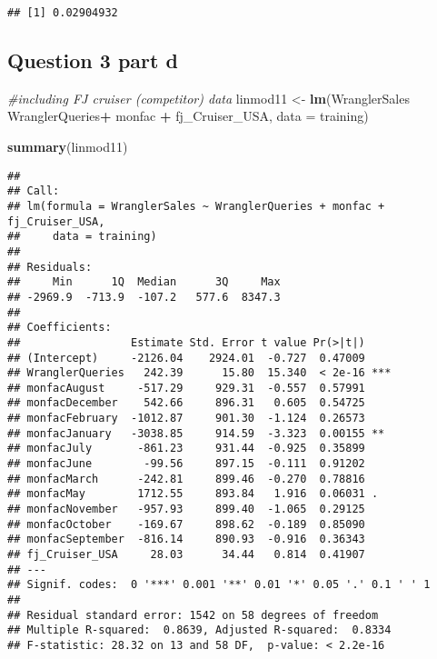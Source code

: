 \documentclass[]{article}
\newenvironment{Shaded}{\begin{snugshade}}{\end{snugshade}}
\newcommand{\KeywordTok}[1]{\textcolor[rgb]{0.13,0.29,0.53}{\textbf{#1}}}
\newcommand{\DataTypeTok}[1]{\textcolor[rgb]{0.13,0.29,0.53}{#1}}
\newcommand{\StringTok}[1]{\textcolor[rgb]{0.31,0.60,0.02}{#1}}
\newcommand{\CommentTok}[1]{\textcolor[rgb]{0.56,0.35,0.01}{\textit{#1}}}
\newcommand{\OperatorTok}[1]{\textcolor[rgb]{0.81,0.36,0.00}{\textbf{#1}}}
\newcommand{\NormalTok}[1]{#1}
\begin{document}
\begin{verbatim}
## [1] 0.02904932
\end{verbatim}

\subsection{Question 3 part d}\label{question-3-part-d}

\begin{Shaded}
\begin{Highlighting}[]
\CommentTok{#including FJ cruiser (competitor) data}
\NormalTok{linmod11 <-}\StringTok{ }\KeywordTok{lm}\NormalTok{(WranglerSales }\OperatorTok{~}\StringTok{ }\NormalTok{WranglerQueries}\OperatorTok{+}\StringTok{ }\NormalTok{monfac }\OperatorTok{+}\StringTok{ }\NormalTok{fj_Cruiser_USA, }\DataTypeTok{data =}\NormalTok{ training)}

\KeywordTok{summary}\NormalTok{(linmod11)}
\end{Highlighting}
\end{Shaded}

\begin{verbatim}
## 
## Call:
## lm(formula = WranglerSales ~ WranglerQueries + monfac + fj_Cruiser_USA, 
##     data = training)
## 
## Residuals:
##     Min      1Q  Median      3Q     Max 
## -2969.9  -713.9  -107.2   577.6  8347.3 
## 
## Coefficients:
##                 Estimate Std. Error t value Pr(>|t|)    
## (Intercept)     -2126.04    2924.01  -0.727  0.47009    
## WranglerQueries   242.39      15.80  15.340  < 2e-16 ***
## monfacAugust     -517.29     929.31  -0.557  0.57991    
## monfacDecember    542.66     896.31   0.605  0.54725    
## monfacFebruary  -1012.87     901.30  -1.124  0.26573    
## monfacJanuary   -3038.85     914.59  -3.323  0.00155 ** 
## monfacJuly       -861.23     931.44  -0.925  0.35899    
## monfacJune        -99.56     897.15  -0.111  0.91202    
## monfacMarch      -242.81     899.46  -0.270  0.78816    
## monfacMay        1712.55     893.84   1.916  0.06031 .  
## monfacNovember   -957.93     899.40  -1.065  0.29125    
## monfacOctober    -169.67     898.62  -0.189  0.85090    
## monfacSeptember  -816.14     890.93  -0.916  0.36343    
## fj_Cruiser_USA     28.03      34.44   0.814  0.41907    
## ---
## Signif. codes:  0 '***' 0.001 '**' 0.01 '*' 0.05 '.' 0.1 ' ' 1
## 
## Residual standard error: 1542 on 58 degrees of freedom
## Multiple R-squared:  0.8639, Adjusted R-squared:  0.8334 
## F-statistic: 28.32 on 13 and 58 DF,  p-value: < 2.2e-16
\end{verbatim}
\end{document}
